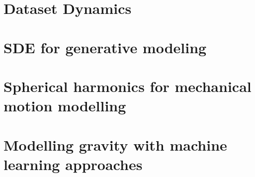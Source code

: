 \documentclass{mybook}
\begin{document}
    \clearpage
    \chapter{Dataset Dynamics}
    

    \clearpage
    \chapter{SDE for generative modeling}
    
    
    \clearpage
    \chapter{Spherical harmonics for mechanical motion modelling}
    
    
    \clearpage
    \chapter{Modelling gravity with machine learning approaches}
    

    \clearpage
    \printbibliography
\end{document}
